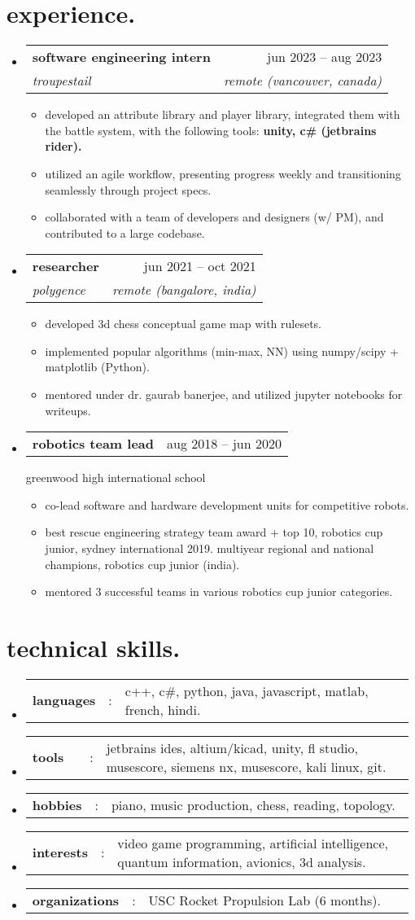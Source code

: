 \documentclass[a4paper,11pt]{article}
\makeatletter
\newcommand{\resumeItem}[1]{
  \item\small{#1}
}
\newcommand{\resumeItemListStart}{\begin{itemize}[rightmargin=0.11in]}
\newcommand{\resumeItemListEnd}{\end{itemize}}
\newcommand{\resumeSectionType}[3]{
  \item\begin{tabular*}{0.96\textwidth}[t]{
    p{0.15\linewidth}p{0.02\linewidth}p{0.81\linewidth}
  }
    \textbf{#1} & #2 & #3
  \end{tabular*}\vspace{-2pt}
}
\newcommand{\resumeQuadHeading}[4]{
  \item
  \begin{tabular*}{0.96\textwidth}[t]{l@{\extracolsep{\fill}}r}
    \textbf{#1} & #2 \\
    \textit{\small#3} & \textit{\small #4} \\
  \end{tabular*}
}
\newcommand{\resumeQuadHeadingChild}[2]{
  \item
  \begin{tabular*}{0.96\textwidth}[t]{l@{\extracolsep{\fill}}r}
    \textbf{\small#1} & {\small#2} \\
  \end{tabular*}
}
\newcommand{\resumeHeadingListStart}{
  \begin{itemize}[leftmargin=0.15in, label={}]
}
\newcommand{\resumeHeadingListEnd}{\end{itemize}}
\makeatother
\begin{document}
\section{experience.}
\resumeHeadingListStart{}
  \resumeQuadHeading{software engineering intern}{jun 2023 -- aug 2023}
      {troupestail}{remote (vancouver, canada)}
    \resumeItemListStart{}
      \resumeItem{developed an attribute library and player library, integrated them with the battle system, with the following tools: \textbf{unity, c\# (jetbrains rider).}}
      \resumeItem{utilized an agile workflow, presenting progress weekly and transitioning seamlessly through project specs.}
      \resumeItem{collaborated with a team of developers and designers (w/ PM), and contributed to a large codebase.}
    \resumeItemListEnd{}

  \resumeQuadHeading{researcher}{jun 2021 -- oct 2021}
  {polygence}{remote (bangalore, india)}
    \resumeItemListStart{}
        \resumeItem{developed 3d chess conceptual game map with rulesets.}
      \resumeItem{implemented popular algorithms (min-max, NN) using numpy/scipy + matplotlib (Python).}
      \resumeItem{mentored under dr. gaurab banerjee, and utilized jupyter notebooks for writeups.}
    \resumeItemListEnd{}

  \resumeQuadHeadingChild{robotics team lead}{aug 2018 -- jun 2020}
  {greenwood high international school}
    \resumeItemListStart{}
      \resumeItem{co-lead software and hardware development units for competitive robots.}
      \resumeItem{best rescue engineering strategy team award + top 10, robotics cup junior, sydney international 2019. multiyear regional and national champions, robotics cup junior (india).}
      \resumeItem{mentored 3 successful teams in various robotics cup junior categories.}
    \resumeItemListEnd{}
\resumeHeadingListEnd{}


\section{technical skills.}
  \resumeHeadingListStart{}
    \resumeSectionType{languages}{:}{c++, c\#, python, java, javascript, matlab, french, hindi.}
    \resumeSectionType{tools}{:}{jetbrains ides, altium/kicad, unity, fl studio, musescore, siemens nx, musescore, kali linux, git.}
    \resumeSectionType{hobbies}{:}{piano, music production, chess, reading, topology.}
    \resumeSectionType{interests}{:}{video game programming, artificial intelligence, quantum information, avionics, 3d analysis.}
    \resumeSectionType{organizations}{:}{USC Rocket Propulsion Lab (6 months).}
  \resumeHeadingListEnd{}
\end{document}
